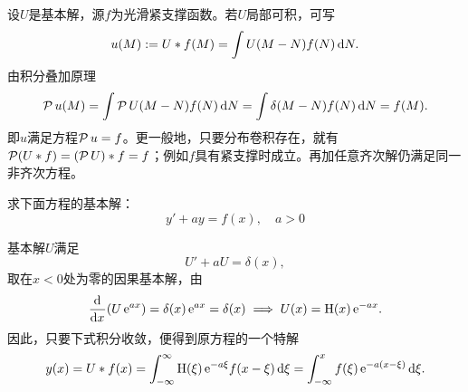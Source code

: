 设$U$是基本解，源$f$为光滑紧支撑函数。若$U$局部可积，可写
\begin{align}
	u(M) := U \ast f(M) = \int U(M - N)f(N)\mathop{}\!\mathrm{d} N.
\end{align}
由积分叠加原理
\[
	\operatorname{\mathcal P} u(M) = \int\operatorname{\mathcal P} U(M - N)f(N)\mathop{}\!\mathrm{d} N = \int\delta(M - N)f(N)\mathop{}\!\mathrm{d} N = f(M).
\]
即$u$满足方程$\operatorname{\mathcal P} u = f$。更一般地，只要分布卷积存在，就有$\operatorname{\mathcal P}(U \ast f) = (\operatorname{\mathcal P} U) \ast f = f$；例如$f$具有紧支撑时成立。再加任意齐次解仍满足同一非齐次方程。
\begin{example}{}{}
	求下面方程的基本解：
	\[
		y' + ay = f(x),\quad a > 0
	\]
	
	基本解$U$满足
	\[
		U' + aU = \delta(x),
	\]
	取在$x < 0$处为零的因果基本解，由
	\begin{equation}
		\label{eq:mmp-first-order-causal-kernel}
		\frac{\mathop{}\!\mathrm{d}^{}}{\mathrm{d}{x}^{}}(U\mathop{}\!\mathrm{e}^{ax}) = \delta(x)\mathop{}\!\mathrm{e}^{ax} = \delta(x) \implies U(x) = \operatorname{H}(x)\mathop{}\!\mathrm{e}^{-ax}.
	\end{equation}
	因此，只要下式积分收敛，便得到原方程的一个特解
	\begin{equation}
		\label{eq:mmp-causal-first-order-solution}
		y(x) = U \ast f(x) = \int_{-\infty}^\infty\operatorname{H}(\xi)\mathop{}\!\mathrm{e}^{-a\xi}f(x - \xi)\mathop{}\!\mathrm{d}\xi = \int_{-\infty}^xf(\xi)\mathop{}\!\mathrm{e}^{-a(x-\xi)}\mathop{}\!\mathrm{d}\xi.
	\end{equation}
\end{example}
